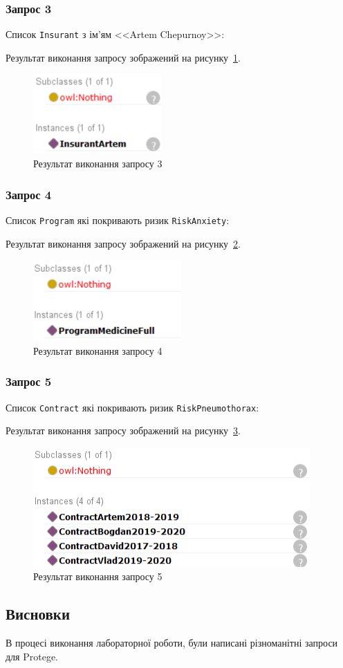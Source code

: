 \subsubsection*{Запрос 3}
Список \texttt{Insurant} з ім'ям <<Artem Chepurnoy>>:
 

Результат виконання запросу зображений на рисунку~\ref{fig:dl_1}.

\begin{figure}[H]
	\centering
	    \includegraphics{dl_1}
	\caption{Результат виконання запросу 3}
	\label{fig:dl_1}
\end{figure}

\subsubsection*{Запрос 4}
Список \texttt{Program} які покривають ризик \texttt{RiskAnxiety}:
 

Результат виконання запросу зображений на рисунку~\ref{fig:dl_2}.

\begin{figure}[H]
	\centering
	    \includegraphics{dl_2}
	\caption{Результат виконання запросу 4}
	\label{fig:dl_2}
\end{figure}

\subsubsection*{Запрос 5}
Список \texttt{Contract} які покривають ризик \texttt{RiskPneumothorax}:
 

Результат виконання запросу зображений на рисунку~\ref{fig:dl_3}.

\begin{figure}[H]
	\centering
	    \includegraphics{dl_3}
	\caption{Результат виконання запросу 5}
	\label{fig:dl_3}
\end{figure}

\subsection*{Висновки}
В процесі виконання лабораторної роботи, були написані різноманітні запроси для Protege.


